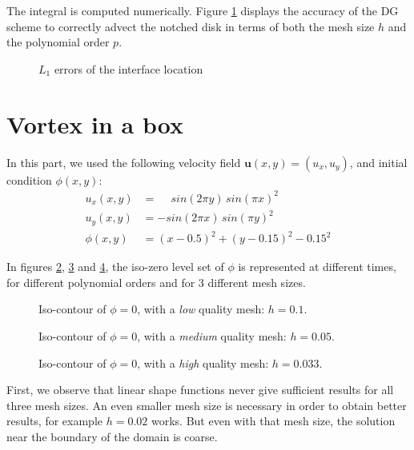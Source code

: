 \documentclass[11 pt]{article}
\begin{document}
The integral is computed numerically. Figure \ref{fig:L1_err} displays the accuracy of the DG scheme to correctly advect the notched disk in terms of both the mesh size $h$ and the polynomial order $p$.

\begin{figure}[H]
    \centering
    
    \caption{$L_1$ errors of the interface location}
    \label{fig:L1_err}
\end{figure}


\section{Vortex in a box}

In this part, we used the following velocity field $\bm{u}(x,y) = (u_x, u_y)$, and initial condition $\phi(x,y)$:
\begin{align*}
    u_x(x,y) &= \phantom{-} sin(2 \pi y) \, sin(\pi x)^2\\
    u_y(x,y) &= -sin(2 \pi x) \, sin(\pi y)^2\\
    \phi(x,y) &= (x-0.5)^2 + (y-0.15)^2 - 0.15^2
\end{align*}

In figures \ref{fig:vortexLow}, \ref{fig:vortexMid} and \ref{fig:vortexHigh}, the iso-zero level set of $\phi$ is represented at different times, for different polynomial orders and for 3 different mesh sizes.

\begin{figure}[H]
    \centering
    
    \caption{Iso-contour of $\phi=0$, with a \textit{low} quality mesh: $h=0.1$.}
    \label{fig:vortexLow}
\end{figure}


\begin{figure}[H]
    \centering
    
    \caption{Iso-contour of $\phi=0$, with a \textit{medium} quality mesh: $h=0.05$.}
    \label{fig:vortexMid}
\end{figure}


\begin{figure}[H]
    \centering
    
    \caption{Iso-contour of $\phi=0$, with a \textit{high} quality mesh: $h=0.033$.}
    \label{fig:vortexHigh}
\end{figure}

First, we observe that linear shape functions never give sufficient results for all three mesh sizes. An even smaller mesh size is necessary in order to obtain better results, for example $h=0.02$ works. But even with that mesh size, the solution near the boundary of the domain is coarse.
\end{document}
